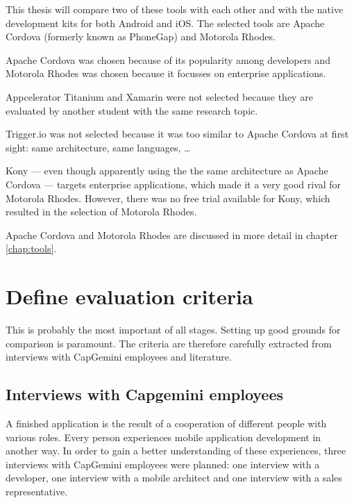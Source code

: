 This thesis will compare two of these tools with each other and  with the native development kits for both Android and iOS. The selected tools are Apache Cordova (formerly known as PhoneGap) and Motorola Rhodes. 

Apache Cordova was chosen because of its popularity among developers and Motorola Rhodes was chosen because it focusses on enterprise applications. 

Appcelerator Titanium and Xamarin were not selected because they are evaluated by another student with the same research topic. 

Trigger.io was not selected because it was too similar to Apache Cordova at first sight: same architecture, same languages, \ldots


Kony --- even though apparently using the the same architecture as Apache Cordova --- targets enterprise applications, which made it a very good rival for Motorola Rhodes. However, there was no free trial available for Kony, which resulted in the selection of Motorola Rhodes.

Apache Cordova and Motorola Rhodes are discussed in more detail in chapter \ref{chap:tools}.

\section{Define evaluation criteria}

This is probably the most important of all stages. Setting up good grounds for comparison is paramount. The criteria are therefore carefully extracted from interviews with CapGemini employees and literature.

\subsection{Interviews with Capgemini employees}
\label{sec:interviews}

A finished application is the result of a cooperation of different people with various roles. Every person experiences mobile application development in another way. In order to gain a better understanding of these experiences, three interviews with CapGemini employees were planned: one interview with a developer, one interview with a mobile architect and one interview with a sales representative. 

